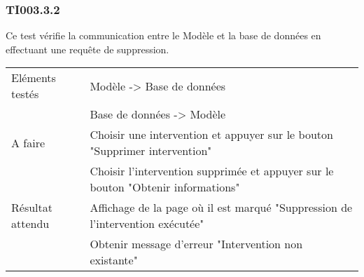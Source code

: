   		
  	\subsubsection{TI003.3.2}
  		Ce test vérifie la communication entre le Modèle et la base de données en effectuant une requête de suppression.
  		\begin{center}
    	 		\begin{tabular}[h]{|p{}|p{}|}
			\hline
				Eléments testés & Modèle -> Base de données  \\
							    &  Base de données -> Modèle \\\hline
    				A faire & Choisir une intervention et appuyer sur le bouton "Supprimer intervention" \\
    						& Choisir l'intervention supprimée et appuyer sur le bouton "Obtenir informations" \\\hline
    				Résultat attendu & Affichage de la page où il est marqué "Suppression de l'intervention exécutée" \\  								 & Obtenir message d'erreur "Intervention non existante" \\\hline
     		\end{tabular}
  		\end{center}	
  	
  		